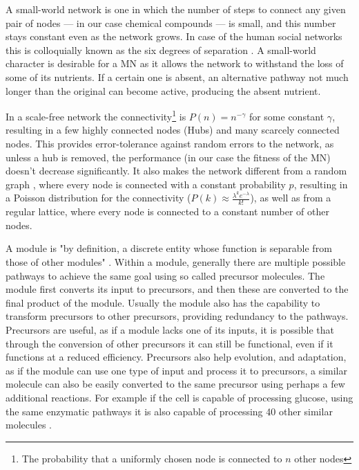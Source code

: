 \documentclass[a4paper,12pt]{article}
\begin{document}
	A small-world network \cite{smallworld} is one in which the number of steps to connect any given pair of nodes --- in our case chemical compounds --- is small, and this number stays constant even as the network grows. In case of the human social networks this is colloquially known as the six degrees of separation \cite{sixdegrees}. A small-world character is desirable for a MN as it allows the network to withstand the loss of some of its nutrients. If a certain one is absent, an alternative pathway not much longer than the original can become active, producing the absent nutrient. %
	 
	In a scale-free network the connectivity\footnote{The probability that a uniformly chosen node is connected to $n$ other nodes} is $P(n)=n^{-\gamma}$ for some constant $\gamma$, resulting in a few highly connected nodes (Hubs) and many scarcely connected nodes. This provides error-tolerance against random errors to the network, as unless a hub is removed, the performance (in our case the fitness of the MN) doesn't decrease significantly. It also makes the network different from a random graph \cite{randomgraphs}, where every node is connected with a constant probability $p$, resulting in a Poisson distribution for the connectivity ($P(k) \approx \frac{\lambda^k e^{-\lambda}}{k!} $), as well as from a regular lattice, where every node is connected to a constant number of other nodes.
	  
	A module is "by definition, a discrete entity whose function is separable from those of other modules" \cite{modulardef}. Within a module, generally there are multiple possible pathways to achieve the same goal using so called precursor molecules. The module first converts its input to precursors, and then these are converted to the final product of the module. Usually the module also has the capability to transform precursors to other precursors, providing redundancy to the pathways. Precursors are useful, as if a module lacks one of its inputs, it is possible that through the conversion of other precursors it can still be functional, even if it functions at a reduced efficiency. Precursors also help evolution, and adaptation, as if the module can use one type of input and process it to precursors, a similar molecule can also be easily converted to the same precursor using perhaps a few additional reactions. For example if the cell is capable of processing glucose, using the same enzymatic pathways it is also capable of processing 40 other similar molecules \cite{latent}.
	
\end{document}
